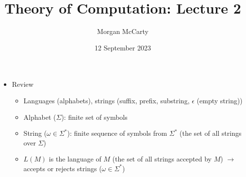 \documentclass[12pt]{article}
\title{
    Theory of Computation: Lecture 2}
\author{Morgan McCarty}
\date{12 September 2023}
\begin{document}
    \maketitle

    \begin{itemize}
        \item Review
        \begin{itemize}
            \item Languages (alphabets), strings (suffix, prefix, substring, $\epsilon$ (empty string))
            \item Alphabet ($\Sigma$): finite set of symbols
            \item String ($\omega \in \Sigma^*$): finite sequence of symbols from $\Sigma^*$ (the set of all strings over $\Sigma$)
            \item $L(M)$ is the language of $M$ (the set of all strings accepted by $M$) $\rightarrow$ accepts or rejects strings ($\omega \in \Sigma^*$)
        \end{itemize}
    \end{itemize}
\end{document}

